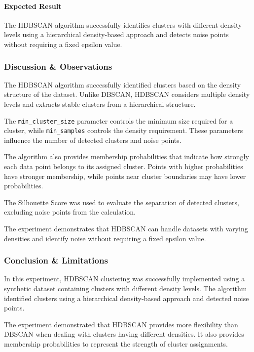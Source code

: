 \documentclass[a4paper,11pt]{article}
\begin{document}
\paragraph{Expected Result}
The HDBSCAN algorithm successfully identifies clusters with different density levels using a hierarchical density-based approach and detects noise points without requiring a fixed epsilon value.

\subsubsection{Discussion \& Observations}

The HDBSCAN algorithm successfully identified clusters based on the density structure of the dataset. Unlike DBSCAN, HDBSCAN considers multiple density levels and extracts stable clusters from a hierarchical structure.

The \texttt{min\_cluster\_size} parameter controls the minimum size required for a cluster, while \texttt{min\_samples} controls the density requirement. These parameters influence the number of detected clusters and noise points.

The algorithm also provides membership probabilities that indicate how strongly each data point belongs to its assigned cluster. Points with higher probabilities have stronger membership, while points near cluster boundaries may have lower probabilities.

The Silhouette Score was used to evaluate the separation of detected clusters, excluding noise points from the calculation.

The experiment demonstrates that HDBSCAN can handle datasets with varying densities and identify noise without requiring a fixed epsilon value.

\subsubsection{Conclusion \& Limitations}

In this experiment, HDBSCAN clustering was successfully implemented using a synthetic dataset containing clusters with different density levels. The algorithm identified clusters using a hierarchical density-based approach and detected noise points.

The experiment demonstrated that HDBSCAN provides more flexibility than DBSCAN when dealing with clusters having different densities. It also provides membership probabilities to represent the strength of cluster assignments.
\end{document}

